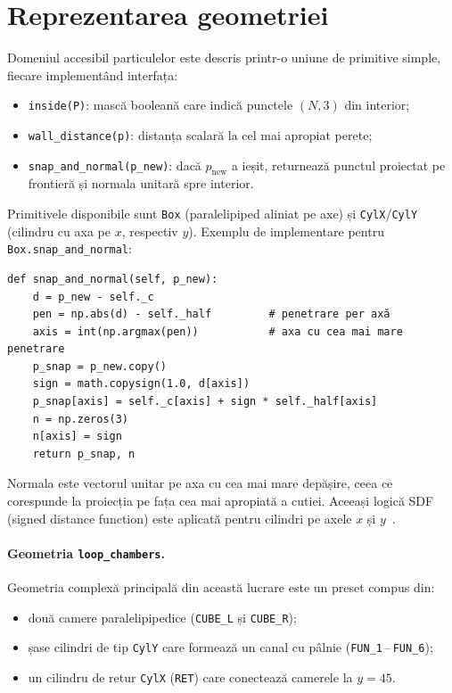 \documentclass[12pt,openright,twoside]{book}
\begin{document}
\section{Reprezentarea geometriei}

Domeniul accesibil particulelor este descris printr-o uniune de primitive simple, fiecare implementând interfața:

\begin{itemize}
    \item \texttt{inside(P)}: mască booleană care indică punctele $(N,3)$ din interior;
    \item \texttt{wall\_distance(p)}: distanța scalară la cel mai apropiat perete;
    \item \texttt{snap\_and\_normal(p\_new)}: dacă $p_\text{new}$ a ieșit, returnează punctul proiectat pe frontieră și normala unitară spre interior.
\end{itemize}

Primitivele disponibile sunt \texttt{Box} (paralelipiped aliniat pe axe) și \texttt{CylX}/\texttt{CylY} (cilindru cu axa pe $x$, respectiv $y$). Exemplu de implementare pentru \texttt{Box.snap\_and\_normal}:

\begin{verbatim}
def snap_and_normal(self, p_new):
    d = p_new - self._c
    pen = np.abs(d) - self._half         # penetrare per axă
    axis = int(np.argmax(pen))           # axa cu cea mai mare penetrare
    p_snap = p_new.copy()
    sign = math.copysign(1.0, d[axis])
    p_snap[axis] = self._c[axis] + sign * self._half[axis]
    n = np.zeros(3)
    n[axis] = sign
    return p_snap, n
\end{verbatim}

Normala este vectorul unitar pe axa cu cea mai mare depășire, ceea ce corespunde la proiecția pe fața cea mai apropiată a cutiei. Aceeași logică SDF (signed distance function) este aplicată pentru cilindri pe axele $x$ și $y$~\cite{osher2003}.

\paragraph{Geometria \texttt{loop\_chambers}.}
Geometria complexă principală din această lucrare este un preset compus din:
\begin{itemize}
    \item două camere paralelipipedice (\texttt{CUBE\_L} și \texttt{CUBE\_R});
    \item șase cilindri de tip \texttt{CylY} care formează un canal cu pâlnie (\texttt{FUN\_1}\,--\,\texttt{FUN\_6});
    \item un cilindru de retur \texttt{CylX} (\texttt{RET}) care conectează camerele la $y=45$.
\end{itemize}
\end{document}
